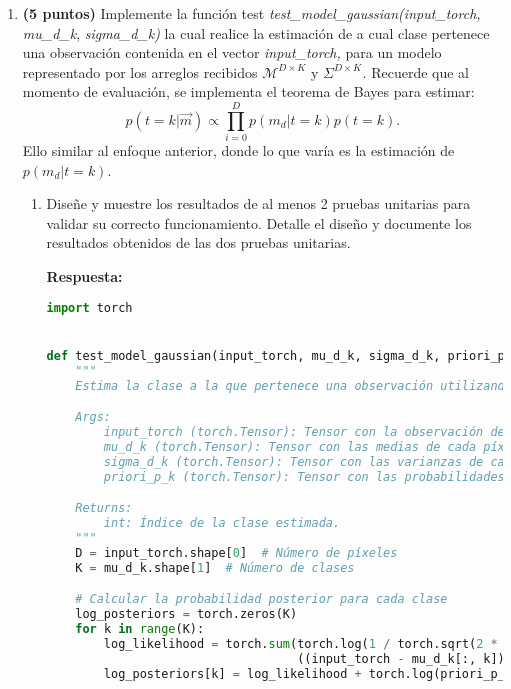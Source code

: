 \documentclass[spanish]{article}
\begin{document}
\begin{enumerate}
\begin{enumerate}
\newpage

\item \textbf{(5 puntos)} Implemente la función test \emph{test\_model\_gaussian(input\_torch,
mu\_d\_k}, \emph{sigma\_d\_k) }la cual realice la estimación de a
cual clase pertenece una observación contenida en el vector \emph{input\_torch,
}para un modelo representado por los arreglos recibidos \emph{$\mathcal{M}^{D\times K}$
}y\emph{ $\Sigma^{D\times K}$.} Recuerde que al momento de evaluación,
se implementa el teorema de Bayes para estimar:
\[
p\left(t=k|\overrightarrow{m}\right)\propto\prod_{i=0}^{D}p\left(m_{d}|t=k\right)p\left(t=k\right).
\]
Ello similar al enfoque anterior, donde lo que varía es la estimación
de $p\left(m_{d}|t=k\right)$.
\begin{enumerate}
\item Diseñe y muestre los resultados de al menos 2 pruebas unitarias para
validar su correcto funcionamiento. Detalle el diseño y documente
los resultados obtenidos de las dos pruebas unitarias.

\vspace{15px}

\textbf{Respuesta:}
\vspace{15px}

\begin{lstlisting}[language=Python, caption=Implementacion Test Model Gaussian]
import torch


def test_model_gaussian(input_torch, mu_d_k, sigma_d_k, priori_p_k):
    """
    Estima la clase a la que pertenece una observación utilizando el modelo Gaussiano.

    Args:
        input_torch (torch.Tensor): Tensor con la observación de forma [D].
        mu_d_k (torch.Tensor): Tensor con las medias de cada píxel para cada clase de forma [D, K].
        sigma_d_k (torch.Tensor): Tensor con las varianzas de cada píxel para cada clase de forma [D, K].
        priori_p_k (torch.Tensor): Tensor con las probabilidades a priori de cada clase.

    Returns:
        int: Índice de la clase estimada.
    """
    D = input_torch.shape[0]  # Número de píxeles
    K = mu_d_k.shape[1]  # Número de clases

    # Calcular la probabilidad posterior para cada clase
    log_posteriors = torch.zeros(K)
    for k in range(K):
        log_likelihood = torch.sum(torch.log(1 / torch.sqrt(2 * torch.pi * sigma_d_k[:, k])) -
                                   ((input_torch - mu_d_k[:, k]) ** 2) / (2 * sigma_d_k[:, k]))
        log_posteriors[k] = log_likelihood + torch.log(priori_p_k[k])


\end{lstlisting}
\end{enumerate}
\end{enumerate}
\end{enumerate}
\end{document}
